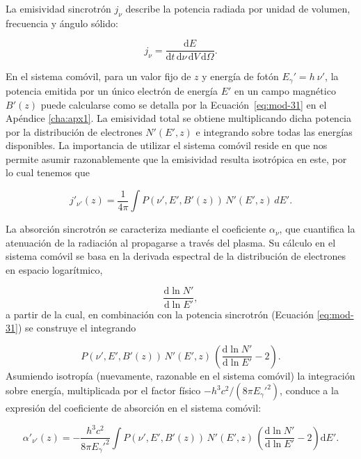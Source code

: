 	La emisividad sincrotrón $j_\nu$ describe la potencia radiada por unidad de volumen, frecuencia y ángulo sólido:

\begin{equation}\label{eq:mod-32}
    j_\nu = \frac{\mathrm{d}E}{\mathrm{d}t\, \mathrm{d}\nu\, \mathrm{d}V\, \mathrm{d}\Omega}.
\end{equation}

	En el sistema comóvil, para un valor fijo de $z$ y energía de fotón $E_\gamma'=h~\nu'$, la potencia emitida por un único electrón de energía $E'$ en un campo magnético $B'(z)$ puede calcularse como se detalla por la Ecuación~\eqref{eq:mod-31} en el Ap\'endice \ref{cha:apx1}.
	La emisividad total se obtiene multiplicando dicha potencia por la distribución de electrones $N'(E', z)$ e integrando sobre todas las energías disponibles.
	La importancia de utilizar el sistema comóvil reside en que nos permite asumir razonablemente que la emisividad resulta isotrópica en este, por lo cual tenemos que

\begin{equation}
    j'_{\nu'}(z) = \frac{1}{4\pi} 
    \int P(\nu', E', B'(z))\, N'(E', z)\, dE'.
    \label{eq:mod-33}
\end{equation}

	La {absorción sincrotrón} se caracteriza mediante el coeficiente $\alpha_\nu$, que cuantifica la atenuación de la radiación al propagarse a través del plasma.
	Su cálculo en el sistema comóvil se basa en la derivada espectral de la distribución de electrones en espacio logarítmico,

\begin{equation}\label{eq:mod-34}
    \frac{\mathrm{d} \ln N'}{\mathrm{d} \ln E'},
\end{equation}
a partir de la cual, en combinaci\'on con la potencia sincrotrón (Ecuación \eqref{eq:mod-31}) se construye el integrando

\begin{equation}\label{eq:mod-35}
    P(\nu', E', B'(z))\, N'(E', z)\, 
    \left( \frac{\mathrm{d} \ln N'}{\mathrm{d} \ln E'} - 2 \right).
\end{equation}
	Asumiendo isotropía (nuevamente, razonable en el sistema comóvil) la integración sobre energía, multiplicada por el factor físico $-h^3 c^2 / (8\pi E_\gamma'^2)$, conduce a la expresión del coeficiente de absorción en el sistema comóvil:

\begin{equation}
    \alpha'_{\nu'}(z) = 
    -\frac{h^3 c^2}{8 \pi E_\gamma'^2}
    \int P(\nu', E', B'(z))\, N'(E', z)\, 
    \left( \frac{\mathrm{d} \ln N'}{\mathrm{d} \ln E'} - 2 \right) \mathrm{d}E'.
    \label{eq:mod-36}
\end{equation}

